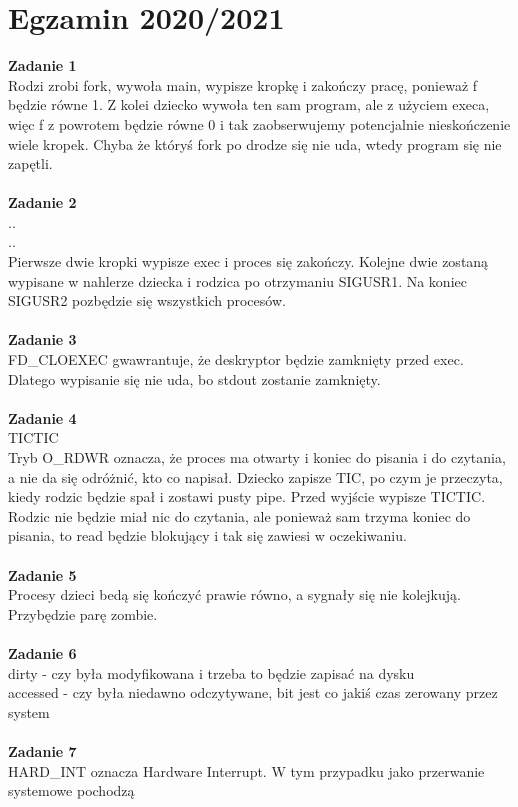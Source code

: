 \documentclass[12pt, a4paper, polish, openany]{book}
\begin{document}
\section{Egzamin 2020/2021}
\textbf{Zadanie 1} \\
Rodzi zrobi fork, wywoła main, wypisze kropkę i zakończy pracę, ponieważ f będzie równe 1.
Z kolei dziecko wywoła ten sam program, ale z użyciem execa, więc f z powrotem będzie równe 0 i tak zaobserwujemy potencjalnie nieskończenie wiele kropek. Chyba że któryś fork po drodze się nie uda, wtedy program się nie zapętli. \\\\
\textbf{Zadanie 2} \\
.. \\
.. \\
Pierwsze dwie kropki wypisze exec i proces się zakończy. Kolejne dwie zostaną wypisane w nahlerze dziecka i rodzica po otrzymaniu SIGUSR1. Na koniec SIGUSR2 pozbędzie się wszystkich procesów. \\\\
\textbf{Zadanie 3} \\
FD\_CLOEXEC gwawrantuje, że deskryptor będzie zamknięty przed exec. Dlatego wypisanie się nie uda, bo stdout zostanie zamknięty. \\\\
\textbf{Zadanie 4} \\
TICTIC \\
Tryb O\_RDWR oznacza, że proces ma otwarty i koniec do pisania i do czytania, a nie da się odróżnić, kto co napisał. Dziecko zapisze TIC, po czym je przeczyta, kiedy rodzic będzie spał i zostawi pusty pipe. Przed wyjście wypisze TICTIC. Rodzic nie będzie miał nic do czytania, ale ponieważ sam trzyma koniec do pisania, to read będzie blokujący i tak się zawiesi w oczekiwaniu. \\\\
\textbf{Zadanie 5} \\
Procesy dzieci bedą się kończyć prawie równo, a sygnały się nie kolejkują. Przybędzie parę zombie. \\\\
\textbf{Zadanie 6} \\
dirty - czy była modyfikowana i trzeba to będzie zapisać na dysku \\
accessed - czy była niedawno odczytywane, bit jest co jakiś czas zerowany przez system \\\\
\textbf{Zadanie 7} \\
HARD\_INT oznacza Hardware Interrupt. W tym przypadku jako przerwanie systemowe pochodzą
\end{document}
